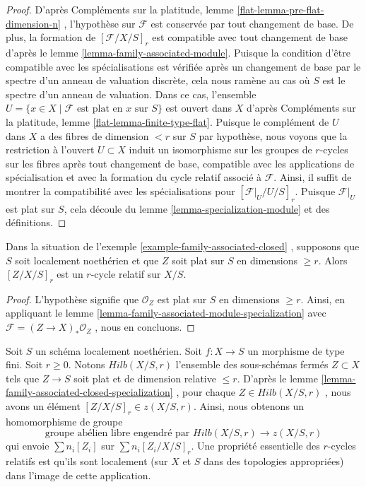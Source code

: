 \begin{proof} 
D'après Compléments sur la platitude, lemme \ref{flat-lemma-pre-flat-dimension-n} 
, l'hypothèse sur  $\mathcal{F}$ est conservée par tout changement de base. 
De plus, la formation de  $[\mathcal{F}/X/S]_r$ est compatible avec tout changement
 de base d'après le lemme  \ref{lemma-family-associated-module}. 
Puisque la condition d'être compatible avec les spécialisations est
 vérifiée après un changement de base par le spectre d'un anneau de valuation 
discrète, cela nous ramène au cas où  $S$  est le spectre d'un anneau de valuation. 
Dans ce cas, l'ensemble  
$U = \{x \in X \mid \mathcal{F}\text{ est plat en }x\text{ sur }S\}$
  est ouvert dans  $X$  
d'après Compléments sur la platitude, lemme \ref{flat-lemma-finite-type-flat}. 
Puisque le complément de  $U$  dans $X$  a des fibres de dimension  $< r$  sur  
$S$  par hypothèse, nous voyons que la restriction à l'ouvert  
$U \subset X$ induit un isomorphisme sur les groupes de  $r$-cycles 
sur les fibres après tout changement de base, compatible avec les applications de
 spécialisation et avec la formation du cycle relatif associé à  $\mathcal{F}$.
 Ainsi, il suffit de montrer la compatibilité avec les
 spécialisations pour  $[\mathcal{F}|_U / U /S]_r$.
 Puisque $\mathcal{F}|_U$  est plat sur  $S$, cela découle du 
lemme  \ref{lemma-specialization-module}  et des définitions. 
\end{proof} 

\begin{lemma} 
\label{lemma-family-associated-closed-specialization} 
Dans la situation de l'exemple  \ref{example-family-associated-closed} , supposons
 que $S$ soit localement noethérien et que  $Z$  soit plat sur  $S$  en dimensions 
$\geq r$. Alors  $[Z/X/S]_r$  est un  $r$-cycle relatif sur $X/S$. 
\end{lemma} 

\begin{proof}
 L'hypothèse signifie que  $\mathcal{O}_Z$  est plat sur  $S$  
en dimensions $\geq r$. Ainsi, en appliquant 
le lemme  \ref{lemma-family-associated-module-specialization}  
avec  $\mathcal{F} = (Z \to X)_*\mathcal{O}_Z$ , nous en concluons. 
\end{proof} 

\noindent
 Soit  $S$  un schéma localement noethérien. Soit  $f : X \to S$  un morphisme
 de type fini. Soit  $r \geq 0$. Notons  $Hilb(X/S, r)$
  l'ensemble des sous-schémas fermés  $Z \subset X$  tels que  $Z \to S$  soit 
plat et de dimension relative $\leq r$. D'après
 le lemme  \ref{lemma-family-associated-closed-specialization} , pour chaque  
$Z \in Hilb(X/S, r)$ , nous avons un élément  $[Z/X/S]_r \in z(X/S, r)$.
 Ainsi, nous obtenons un homomorphisme de groupe 
\begin{equation} 
\label{equation-cycle-classes} 
\text{groupe abélien libre engendré par }Hilb(X/S, r) \longrightarrow z(X/S, r) 
\end{equation} 
qui envoie  $\sum n_i[Z_i]$  sur  $\sum n_i[Z_i/X/S]_r$.
 Une propriété essentielle des $r$-cycles relatifs est qu'ils sont localement 
(sur  $X$  et $S$  dans des topologies appropriées) dans l'image de cette application. 

